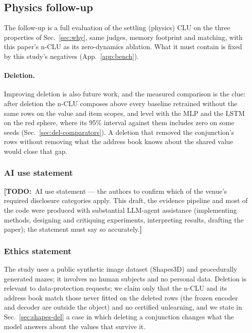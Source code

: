 \documentclass{article} %
\newcommand{\TODO}[1]{{\color{orange}\textbf{[TODO:}~#1\textbf{]}}}
\begin{document}
\subsection{Physics follow-up}
\label{sec:followup}

The follow-up is a full evaluation of the settling (physics) CLU on the three properties of
Sec.~\ref{sec:why}, same judges, memory footprint and matching, with this paper's n-CLU as its zero-dynamics
ablation. What it must contain is fixed by this study's negatives (App.~\ref{app:bench}).

\paragraph{Deletion.} Improving deletion is also future work, and the measured comparison is
the clue: after deletion the n-CLU composes above every baseline retrained without the same rows on
the value and item scopes, and level with the MLP and the LSTM on the red sphere, where its 95\% %
interval against them includes zero on some seeds (Sec.~\ref{sec:del-comparators}). A deletion that
removed the conjunction's rows without removing what the address book knows about the shared value
would close that gap.

\subsubsection*{AI use statement}
\TODO{AI use statement --- the authors to confirm which of the venue's required disclosure categories
apply. This draft, the evidence pipeline and most of the code were produced with substantial LLM-agent
assistance (implementing methods, designing and critiquing experiments, interpreting results,
drafting the paper); the statement must say so accurately.}

\subsubsection*{Ethics statement}
The study uses a public synthetic image dataset (Shapes3D) and procedurally generated mazes; it
involves no human subjects and no personal data. Deletion is relevant to data-protection
requests; we claim only that the n-CLU and its address book match those never fitted on the deleted
rows (the frozen encoder and decoder are outside the object) and no certified unlearning, and
we state in Sec.~\ref{sec:shapes-del} a case in which deleting a conjunction changes what the
model answers about the values that survive it.
\end{document}
